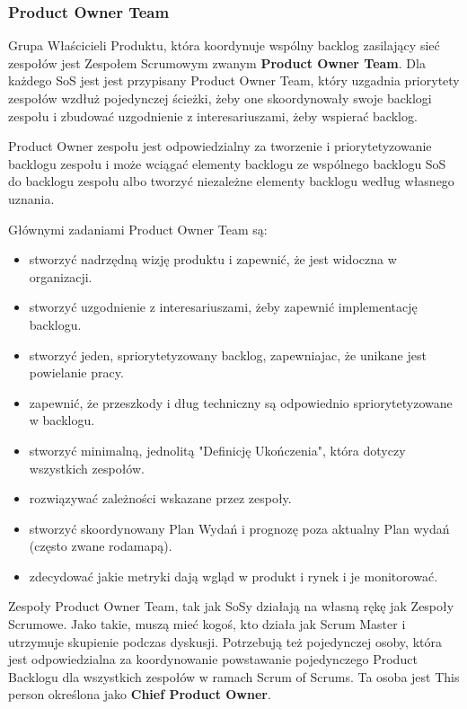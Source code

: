 \documentclass[12pt,a4paper,parskip=full]{scrartcl}
\begin{document}
\subsubsection{Product Owner Team}

Grupa Właścicieli Produktu, która koordynuje wspólny backlog zasilający sieć zespołów jest Zespołem Scrumowym zwanym \textbf{Product Owner Team}. Dla każdego SoS jest jest przypisany Product Owner Team, który uzgadnia priorytety zespołów wzdłuż pojedynczej ścieżki, żeby one skoordynowały swoje backlogi zespołu i zbudować uzgodnienie z interesariuszami, żeby wspierać backlog.

Product Owner zespołu jest odpowiedzialny za tworzenie i priorytetyzowanie backlogu zespołu i może wciągać elementy backlogu ze wspólnego backlogu SoS do backlogu zespołu albo tworzyć niezależne elementy backlogu według własnego uznania.

Głównymi zadaniami Product Owner Team są:

\begin{itemize}
	\item stworzyć nadrzędną wizję produktu i zapewnić, że jest widoczna w organizacji.
	\item stworzyć uzgodnienie z interesariuszami, żeby zapewnić implementację backlogu.
	\item stworzyć jeden, spriorytetyzowany backlog, zapewniajac, że unikane jest powielanie pracy.
	\item zapewnić, że przeszkody i dług techniczny są odpowiednio spriorytetyzowane w backlogu.
	\item stworzyć minimalną, jednolitą "Definicję Ukończenia", która dotyczy wszystkich zespołów.
	\item rozwiązywać zależności wskazane przez zespoły.
	\item stworzyć skoordynowany Plan Wydań i prognozę poza aktualny Plan wydań (często zwane rodamapą).
	\item zdecydować jakie metryki dają wgląd w produkt i rynek i je monitorować.
\end{itemize}

Zespoły Product Owner Team, tak jak SoSy działają na własną rękę jak Zespoły Scrumowe. Jako takie, muszą mieć kogoś, kto działa jak Scrum Master i utrzymuje skupienie podczas dyskusji. Potrzebują też pojedynczej osoby, która jest odpowiedzialna za koordynowanie powstawanie pojedynczego Product Backlogu dla wszystkich zespołów w ramach Scrum of Scrums. Ta osoba jest This person określona jako \textbf{Chief Product Owner}.
\end{document}

